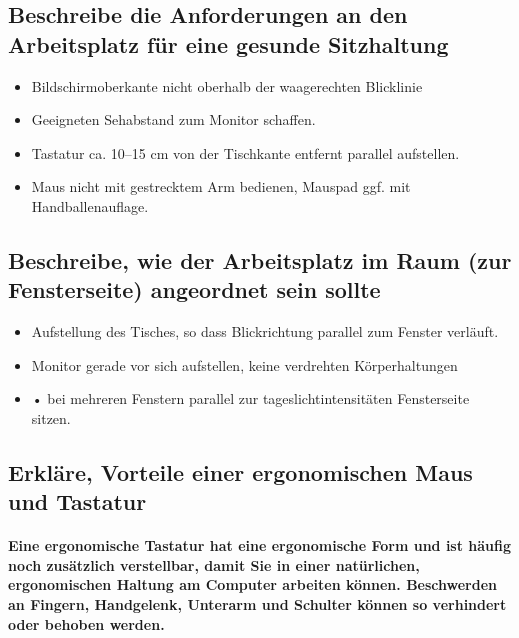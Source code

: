 \documentclass[a4paper]{article}
\begin{document}
    \subsection{\color{red}Beschreibe die Anforderungen an den Arbeitsplatz für eine gesunde Sitzhaltung}\label{subsec:color{red}beschreibe-die-anforderungen-an-den-arbeitsplatz-für-eine-gesunde-sitzhaltung}
    \begin{itemize}
        \color{magenta}
        \item Bildschirmoberkante nicht oberhalb
        der waagerechten Blicklinie
        \item Geeigneten Sehabstand zum
        Monitor schaffen.
        \item Tastatur ca.
        10--15 cm von
        der Tischkante entfernt parallel
        aufstellen.
        \item Maus nicht mit gestrecktem Arm bedienen, Mauspad ggf.
        mit Handballenauflage.
    \end{itemize}

    \subsection{\color{red}Beschreibe, wie der Arbeitsplatz im Raum (zur Fensterseite) angeordnet sein sollte}\label{subsec:color{red}beschreibe-wie-der-arbeitsplatz-im-raum-(zur-fensterseite)-angeordnet-sein-sollte}
    \begin{itemize}
        \color{magenta}
        \item Aufstellung des Tisches, so dass
        Blickrichtung parallel zum Fenster
        verläuft.
        \item Monitor gerade vor sich aufstellen,
        keine verdrehten Körperhaltungen
        \item • bei mehreren Fenstern parallel
        zur tageslichtintensitäten Fensterseite
        sitzen.
    \end{itemize}

    \subsection{\color{red}Erkläre, Vorteile einer ergonomischen Maus und Tastatur}\label{subsec:color{red}erkläre-vorteile-einer-ergonomischen-maus-und-tastatur}

    \paragraph{\color{codegreen} Eine \color{red} ergonomische Tastatur \color{codegreen} hat eine ergonomische Form und ist häufig noch zusätzlich verstellbar, damit Sie in einer natürlichen, ergonomischen Haltung am Computer arbeiten können. Beschwerden an Fingern, Handgelenk, Unterarm und Schulter können so verhindert oder behoben werden.}
\end{document}
